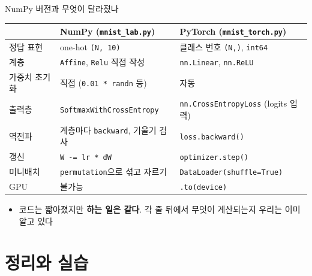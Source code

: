 \documentclass[aspectratio=169,11pt]{beamer}
\newcommand{\code}[1]{\texttt{#1}}
\begin{document}
\begin{frame}{NumPy 버전과 무엇이 달라졌나}
\centering
\small
\renewcommand{\arraystretch}{1.12}
\begin{tabular}{>{\raggedright}p{3.0cm}>{\raggedright}p{4.9cm}>{\raggedright\arraybackslash}p{4.9cm}}
\toprule
& \textbf{NumPy (\code{mnist\_lab.py})} & \textbf{PyTorch (\code{mnist\_torch.py})} \\
\midrule
정답 표현 & one-hot \code{(N, 10)} & 클래스 번호 \code{(N,)}, \code{int64} \\
계층 & \code{Affine}, \code{Relu} 직접 작성 & \code{nn.Linear}, \code{nn.ReLU} \\
가중치 초기화 & 직접 (\code{0.01 * randn} 등) & 자동 \\
출력층 & \code{SoftmaxWithCrossEntropy} & \code{nn.CrossEntropyLoss} (logits 입력) \\
역전파 & 계층마다 \code{backward}, 기울기 검사 & \code{loss.backward()} \\
갱신 & \code{W -= lr * dW} & \code{optimizer.step()} \\
미니배치 & \code{permutation}으로 섞고 자르기 & \code{DataLoader(shuffle=True)} \\
GPU & 불가능 & \code{.to(device)} \\
\bottomrule
\end{tabular}
\vskip2mm
\raggedright
\begin{itemize}
\item 코드는 짧아졌지만 \textbf{하는 일은 같다}. 각 줄 뒤에서 무엇이 계산되는지 우리는 이미 알고 있다
\end{itemize}
\end{frame}

\section{정리와 실습}
\end{document}
